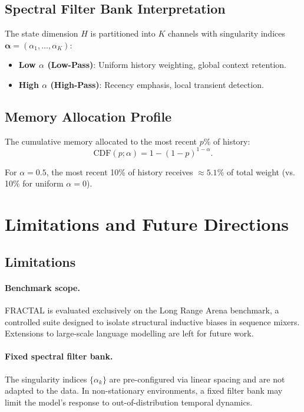 \documentclass{article}
\theoremstyle{plain}
\theoremstyle{definition}
\theoremstyle{remark}
\begin{document}
\subsection{Spectral Filter Bank Interpretation}

The state dimension $H$ is partitioned into $K$ channels with singularity indices $\boldsymbol{\alpha} = (\alpha_1, \ldots, \alpha_K)$:
\begin{itemize}
	\item \textbf{Low $\alpha$ (Low-Pass)}: Uniform history weighting, global context retention.
	\item \textbf{High $\alpha$ (High-Pass)}: Recency emphasis, local transient detection.
\end{itemize}

\subsection{Memory Allocation Profile}

The cumulative memory allocated to the most recent $p\%$ of history:
\begin{equation}
	\text{CDF}(p; \alpha) = 1 - (1-p)^{1-\alpha}.
\end{equation}

For $\alpha = 0.5$, the most recent 10\% of history receives $\approx 5.1\%$ of total weight (vs. 10\% for uniform $\alpha = 0$).

\section{Limitations and Future Directions}
\label{app:future_work}

\subsection*{Limitations}

\paragraph{Benchmark scope.}
FRACTAL is evaluated exclusively on the Long Range Arena benchmark, a controlled
suite designed to isolate structural inductive biases in sequence mixers.
Extensions to large-scale language modelling are left for future work.

\paragraph{Fixed spectral filter bank.}
The singularity indices $\{\alpha_k\}$ are pre-configured via linear spacing and
are not adapted to the data.
In non-stationary environments, a fixed filter bank may limit the model's
response to out-of-distribution temporal dynamics.
\end{document}
